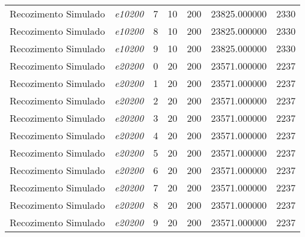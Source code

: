 {\begin{longtable}{cc|c|cc|cc}
			Recozimento Simulado & \textit{e10200}    & 7                               & 10               & 200              & 23825.000000                          & 2330 \\ 
			Recozimento Simulado & \textit{e10200}    & 8                               & 10               & 200              & 23825.000000                          & 2330 \\ 
			Recozimento Simulado & \textit{e10200}    & 9                               & 10               & 200              & 23825.000000                          & 2330 \\ \hline
			Recozimento Simulado & \textit{e20200}    & 0                               & 20               & 200              & 23571.000000                          & 2237 \\ 
			Recozimento Simulado & \textit{e20200}    & 1                               & 20               & 200              & 23571.000000                          & 2237 \\ 
			Recozimento Simulado & \textit{e20200}    & 2                               & 20               & 200              & 23571.000000                          & 2237 \\ 
			Recozimento Simulado & \textit{e20200}    & 3                               & 20               & 200              & 23571.000000                          & 2237 \\ 
			Recozimento Simulado & \textit{e20200}    & 4                               & 20               & 200              & 23571.000000                          & 2237 \\ 
			Recozimento Simulado & \textit{e20200}    & 5                               & 20               & 200              & 23571.000000                          & 2237 \\ 
			Recozimento Simulado & \textit{e20200}    & 6                               & 20               & 200              & 23571.000000                          & 2237 \\ 
			Recozimento Simulado & \textit{e20200}    & 7                               & 20               & 200              & 23571.000000                          & 2237 \\ 
			Recozimento Simulado & \textit{e20200}    & 8                               & 20               & 200              & 23571.000000                          & 2237 \\ 
			Recozimento Simulado & \textit{e20200}    & 9                               & 20               & 200              & 23571.000000                          & 2237 \\ \hline

\end{longtable}}
